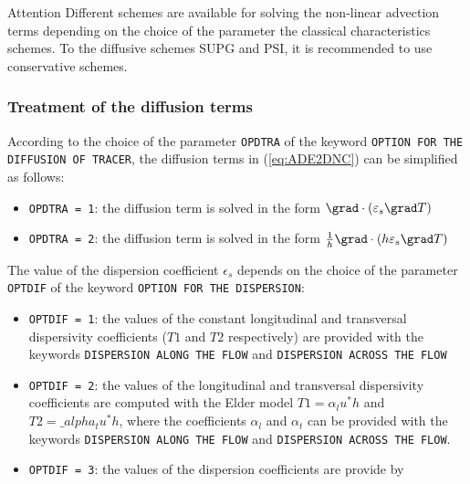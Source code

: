 \begin{bclogo}[couleur = blue!10, arrondi = 0.10, logo = \bcattention]{\textsf{Attention}}
Different schemes are available for solving the non-linear advection terms
depending on the choice of the parameter the classical characteristics
schemes. To the diffusive schemes SUPG and PSI, it is recommended to use conservative schemes. 
\end{bclogo}

\subsubsection{Treatment of the diffusion terms}

According to the choice of the parameter \texttt{OPDTRA} of the keyword \texttt{OPTION FOR THE DIFFUSION OF TRACER}, the diffusion terms in (\ref{eq:ADE2DNC}) can be simplified as follows:

\begin{itemize}
\item \texttt{OPDTRA = 1}: the diffusion term is solved in the form $\grad\cdot(\varepsilon_s\grad T)$
\item \texttt{OPDTRA = 2}: the diffusion term is solved in the form $\frac{1}{h}\grad\cdot(h\varepsilon_s\grad T)$
\end{itemize}

The value of the dispersion coefficient $\epsilon_s$ depends on the
choice of the parameter \texttt{OPTDIF} of the keyword \texttt{OPTION FOR THE DISPERSION}:

\begin{itemize}
\item \texttt{OPTDIF = 1}: the values of the constant longitudinal and transversal dispersivity coefficients ($T1$ and $T2$ respectively) are provided with the keywords \texttt{DISPERSION ALONG THE FLOW} and \texttt{DISPERSION ACROSS THE FLOW} 
\item \texttt{OPTDIF = 2}: the values of the longitudinal and transversal dispersivity coefficients are computed with the Elder model $T1=\alpha_l u^* h$ and $T2=\_alpha_t u^* h$, where the coefficients $\alpha_l$ and $\alpha_t$ can be provided with the keywords \texttt{DISPERSION ALONG THE FLOW} and \texttt{DISPERSION ACROSS THE FLOW}. 
\item \texttt{OPTDIF = 3}: the values of the dispersion coefficients are provide by \teldd
\end{itemize}

